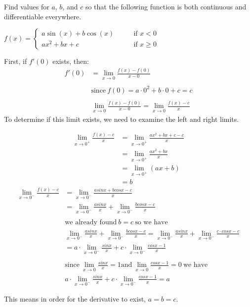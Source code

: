 \documentclass[nooutcomes]{ximera}
\begin{document}
\begin{problem}
Find values for $a$, $b$, and $c$ so that the following function is both continuous and differentiable everywhere.

$f(x) =   \left\{ \begin{array}{cl}
	a \sin(x) + b \cos(x)		 	&	\qquad \text{if } x < 0					\\
	ax^2 + bx + c   				&	\qquad \text{if } x \geq 0	 \end{array} \right.  $
		\begin{freeResponse}
		First, if $f'(0)$ exists, then:
		\begin{align*}
		f'(0)&=\lim_{x\to 0} \frac{f(x)-f(0)}{x-0}\\\\
		& \text{since}\ f(0)=a \cdot 0^2+b \cdot 0 +c =c\\\\
		& \lim_{x\to 0} \frac{f(x)-f(0)}{x-0}=\lim_{x\to 0} \frac{f(x)-c}{x}
		\end{align*}
		To determine if this limit exists, we need to examine the left and right limits.
		
		\begin{align*}
		\lim_{x\to 0^+} \frac{f(x)-c}{x}&=\lim_{x\to 0^+} \frac{ax^2+bx+c-c}{x}\\
		&=\lim_{x\to 0^+} \frac{ax^2+bx}{x}\\
		&=\lim_{x\to 0^+} (ax+b)\\
		&=b
		\end{align*}
		\begin{align*}
		\lim_{x\to 0^-} \frac{f(x)-c}{x}&=\lim_{x\to 0^-} \frac{asinx+bcosx-c}{x}\\
		&=\lim_{x\to 0^-} \frac{asinx}{x}+\lim_{x\to 0^-} \frac{bcosx-c}{x}\\ \\
		& \text{we already found}\ b=c \ \text{so we have}\\
		&\lim_{x\to 0^-} \frac{asinx}{x}+\lim_{x\to 0^-} \frac{bcosx-c}{x}=\lim_{x\to 0^-} \frac{asinx}{x}+\lim_{x\to 0^-} \frac{c\cdot cosx-c}{x}\\
		&=a\cdot \lim_{x\to 0^-} \frac{sinx}{x}+c \cdot \lim_{x\to 0^-} \frac{cosx-1}{x}\\ \\
		& \text{since}\ \lim_{x\to 0} \frac{sinx}{x}=1 \text{and}\  \lim_{x\to 0} \frac{cosx-1}{x}=0 \ \text{we have}\\
		&a\cdot \lim_{x\to 0^-} \frac{sinx}{x}+c \cdot \lim_{x\to 0^-} \frac{cosx-1}{x}=a
		\end{align*}

		This means in order for the derivative to exist, $a=b=c$.
		\end{freeResponse}
\end{problem}
		
\end{document}
